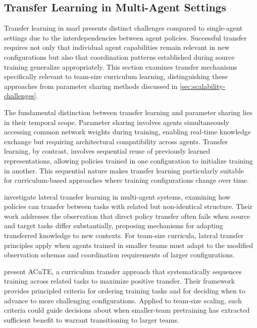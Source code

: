 \subsection{Transfer Learning in Multi-Agent Settings}
\label{subsec:marl-transfer}

Transfer learning in \gls{marl} presents distinct challenges compared to 
single-agent settings due to the interdependencies between agent policies. 
Successful transfer requires not only that individual agent capabilities 
remain relevant in new configurations but also that coordination patterns 
established during source training generalize appropriately. This section 
examines transfer mechanisms specifically relevant to team-size 
curriculum learning, distinguishing these approaches from parameter 
sharing methods discussed in \cref{sec:scalability-challenges}.

The fundamental distinction between transfer learning 
and parameter sharing lies in their temporal scope. 
Parameter sharing involves agents simultaneously 
accessing common network weights during training, 
enabling real-time knowledge exchange but requiring 
architectural compatibility across agents. 
Transfer learning, by contrast, involves sequential 
reuse of previously learned representations, allowing policies 
trained in one configuration to initialize training in another. 
This sequential nature makes transfer learning particularly 
suitable for curriculum-based approaches where training 
configurations change over time.

\cite{shi2023} investigate lateral transfer learning in multi-agent systems, 
examining how policies can transfer between tasks with related but 
non-identical structure. Their work addresses the observation that direct 
policy transfer often fails when source and target tasks differ substantially, 
proposing mechanisms for adapting transferred knowledge to new contexts. 
For team-size curricula, lateral transfer principles apply when agents 
trained in smaller teams must adapt to the modified observation schemas 
and coordination requirements of larger configurations.

\cite{shukla2022} present ACuTE, a curriculum transfer approach that 
systematically sequences training across related tasks to maximize positive transfer. 
Their framework provides principled criteria for ordering training tasks and 
for deciding when to advance to more challenging configurations. 
Applied to team-size scaling, such criteria could guide decisions 
about when smaller-team pretraining has extracted sufficient benefit 
to warrant transitioning to larger teams.

